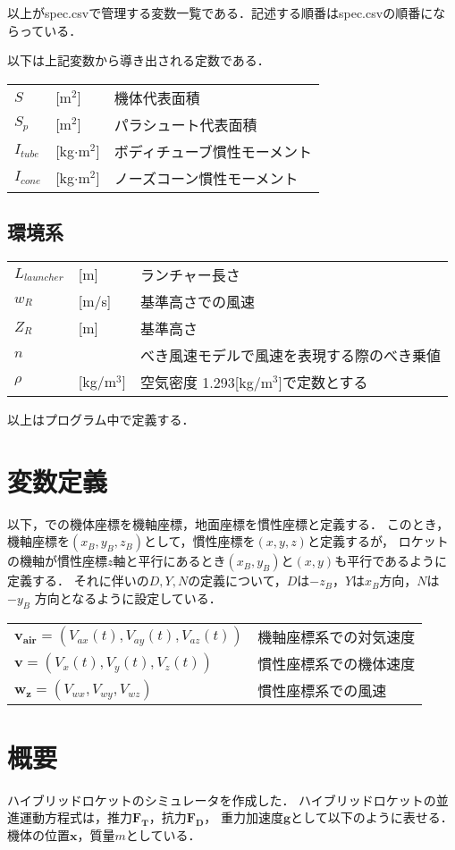 \documentclass{jsarticle}
\begin{document}
以上がspec.csvで管理する変数一覧である．記述する順番はspec.csvの順番にならっている．

以下は上記変数から導き出される定数である．

\begin{tabular}{lll}
$S$ &[m$^2$]&機体代表面積\\
$S_p$ &[m$^2$]&パラシュート代表面積\\
$I_{tube}$ &[kg$\cdot$m$^2$]&ボディチューブ慣性モーメント\\
$I_{cone}$ &[kg$\cdot$m$^2$]&ノーズコーン慣性モーメント\\
\end{tabular}

\subsection{環境系}
\begin{tabular}{lll}
$L_{launcher}$ &[m]&ランチャー長さ\\
$w_R$ &[m/s]&基準高さでの風速\\
$Z_R$ &[m]&基準高さ\\
$n$ &&べき風速モデルで風速を表現する際のべき乗値\\
$\rho$ &[kg/m$^3$] & 空気密度 1.293[kg/m$^3$]で定数とする\\
\end{tabular}

以上はプログラム中で定義する．

\section{変数定義}
以下，\cite{bib1}での機体座標を機軸座標，地面座標を慣性座標と定義する．
このとき，機軸座標を$(x_B, y_B, z_B)$として，慣性座標を$(x, y, z)$と定義するが，
ロケットの機軸が慣性座標$z$軸と平行にあるとき$(x_B, y_B)$と$(x, y)$も平行であるように定義する．
それに伴い\cite{bib1}の$D, Y, N$の定義について，$D$は$-z_B$，$Y$は$x_B$方向，$N$は$-y_B$
方向となるように設定している．

\begin{tabular}{ll}
$\bm{v_{air}} = (V_{ax}(t), V_{ay}(t), V_{az}(t))$ &機軸座標系での対気速度\\
$\bm{v}　= (V_{x}(t), V_{y}(t), V_{z}(t))$ &慣性座標系での機体速度\\
$\bm{w_z} = (V_{wx},  V_{wy}, V_{wz})$ &慣性座標系での風速\\
\end{tabular}


\section{概要}
ハイブリッドロケットのシミュレータを作成した．
ハイブリッドロケットの並進運動方程式は，推力$\bm{F_T}$，抗力$\bm{F_D}$，
重力加速度$\bm{g}$として以下のように表せる．機体の位置$\bm{x}$，質量$m$としている．
\end{document}
